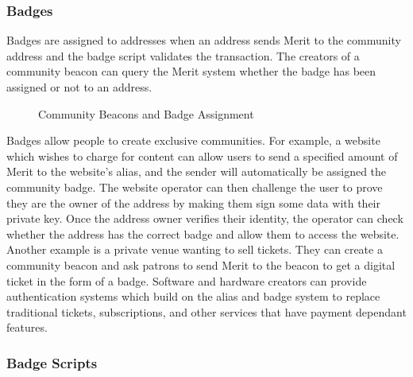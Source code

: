 \documentclass{article}
\begin{document}
\subsubsection{Badges}

Badges are assigned to addresses when an address sends Merit to the community address
and the badge script validates the transaction. The creators of a community beacon
can query the Merit system whether the badge has been assigned or not to an address.

\begin{figure}[H]
    \begin{center}
    \end{center}
    \caption{Community Beacons and Badge Assignment}
\end{figure}

Badges allow people to create exclusive communities. For example, a website
which wishes to charge for content can allow users to send a specified amount
of Merit to the website's alias, and the sender will automatically be assigned the
community badge. The website operator can then challenge the user to prove they
are the owner of the address by making them sign some data with their private
key. Once the address owner verifies their identity, the operator can check 
whether the address has the correct badge and allow them to access the website.
Another example is a private venue wanting to sell tickets. They can create a 
community beacon and ask patrons to send Merit to the beacon to get a digital
ticket in the form of a badge. Software and hardware creators can provide
authentication systems which build on the alias and badge system to replace
traditional tickets, subscriptions, and other services that have payment dependant
features.

\subsubsection{Badge Scripts}
\end{document}
